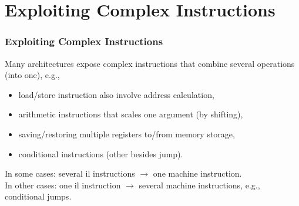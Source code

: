 \documentclass{beamer}
\begin{document}
\section{Exploiting Complex Instructions}

\begin{frame}[fragile]
	\tableofcontents[currentsection]
\end{frame}


\begin{frame}[fragile,t]
   \frametitle{Exploiting Complex Instructions}

\bigskip


Many architectures expose complex instructions that combine several
operations (into one), e.g.,\smallskip

\begin{itemize}

    \item load/store instruction also involve address calculation,\bigskip

    \item arithmetic instructions that scales one argument (by shifting),\bigskip

    \item saving/restoring multiple registers to/from memory storage,\bigskip

    \item conditional instructions (other besides jump).

\end{itemize}

\bigskip

In some cases: several {\sc il} instructions $\rightarrow$ one machine instruction.\\\smallskip
In other cases: one {\sc il} instruction $\rightarrow$ several machine instructions,
e.g., conditional jumps.

\end{frame}
\end{document}
